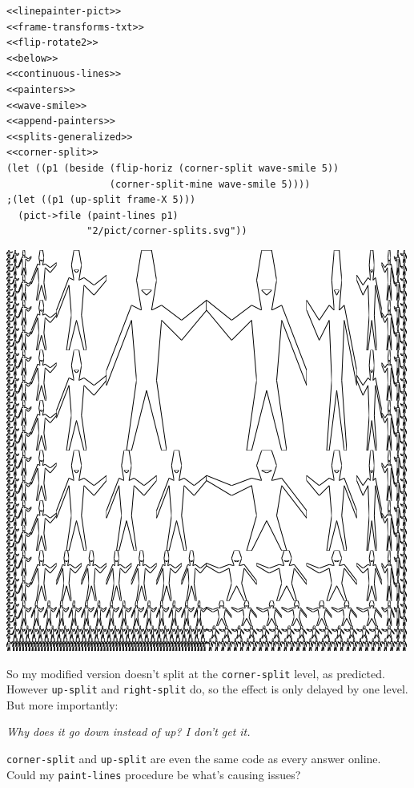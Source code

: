 \documentclass[final,fleqn,titlepage,twoside]{article}
\begin{document}
\begin{verbatim}
<<linepainter-pict>>
<<frame-transforms-txt>>
<<flip-rotate2>>
<<below>>
<<continuous-lines>>
<<painters>>
<<wave-smile>>
<<append-painters>>
<<splits-generalized>>
<<corner-split>>
(let ((p1 (beside (flip-horiz (corner-split wave-smile 5))
                  (corner-split-mine wave-smile 5))))
;(let ((p1 (up-split frame-X 5)))
  (pict->file (paint-lines p1)
              "2/pict/corner-splits.svg"))
\end{verbatim}

\begin{center}
\includegraphics[width=.9\linewidth]{2/pict/corner-splits.png}
\end{center}

So my modified version doesn't split at the \texttt{corner-split} level, as
predicted. However \texttt{up-split} and \texttt{right-split} do, so the
effect is only delayed by one level. But more importantly:

\emph{Why does it go down instead of up? I don't get it.}

\texttt{corner-split} and \texttt{up-split} are even the same code as
every answer online. Could my \texttt{paint-lines} procedure be what's
causing issues?
\end{document}
